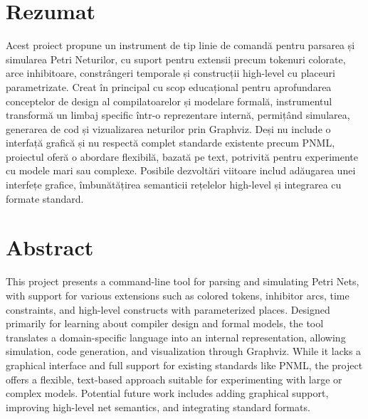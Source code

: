 \cleardoublepage
{\centering \section*{Rezumat} \par}

Acest proiect propune un instrument de tip linie de comandă pentru parsarea și simularea Petri Neturilor, cu suport pentru extensii precum tokenuri colorate, arce inhibitoare, constrângeri temporale și construcții high-level cu placeuri parametrizate. Creat în principal cu scop educațional pentru aprofundarea conceptelor de design al compilatoarelor și modelare formală, instrumentul transformă un limbaj specific într-o reprezentare internă, permițând simularea, generarea de cod și vizualizarea neturilor prin Graphviz. Deși nu include o interfață grafică și nu respectă complet standarde existente precum PNML, proiectul oferă o abordare flexibilă, bazată pe text, potrivită pentru experimente cu modele mari sau complexe. Posibile dezvoltări viitoare includ adăugarea unei interfețe grafice, îmbunătățirea semanticii rețelelor high-level și integrarea cu formate standard.

\bigskip

\bigskip

{\centering \section*{Abstract} \par}
This project presents a command-line tool for parsing and simulating Petri Nets, with support for various extensions such as colored tokens, inhibitor arcs, time constraints, and high-level constructs with parameterized places. Designed primarily for learning about compiler design and formal models, the tool translates a domain-specific language into an internal representation, allowing simulation, code generation, and visualization through Graphviz. While it lacks a graphical interface and full support for existing standards like PNML, the project offers a flexible, text-based approach suitable for experimenting with large or complex models. Potential future work includes adding graphical support, improving high-level net semantics, and integrating standard formats.